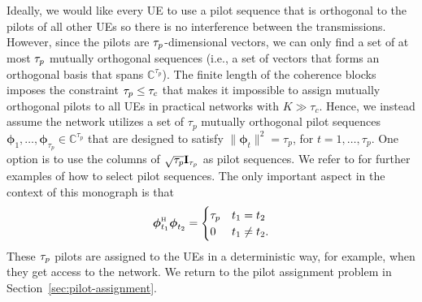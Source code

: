 Ideally, we would like every UE to use a pilot sequence that is orthogonal to the pilots of all other UEs so there is no interference between the transmissions.
However, since the pilots are $\tau_{p}$-dimensional vectors, we can only find a set of at most $\tau_{p}$ mutually orthogonal sequences (i.e., a set of vectors that forms an orthogonal basis that spans $\mathbb{C}^{\tau_p}$). 
The finite length of the coherence blocks imposes the constraint $\tau_{p}\leq \tau_c$ that makes it impossible to assign mutually orthogonal pilots to all \glspl{UE} in practical networks with $K \gg \tau_c$. 
Hence, we instead assume the network utilizes a set of $\tau_p$ mutually orthogonal pilot sequences $\boldsymbol{\phi}_{1},\ldots,\boldsymbol{\phi}_{\tau_p}\in\mathbb{C}^{\tau_p}$ that are designed to satisfy $\| \boldsymbol{\phi}_{t} \|^2 = \tau_p$, for $t=1,\ldots,\tau_p$. One option is to use the columns of $\sqrt{\tau_{p}} \mathbf{I}_{\tau_{p}}$ as pilot sequences.
We refer to \cite[Sec.~3.1.1]{massivemimobook} for further examples of how to select pilot sequences. The only important aspect in the context of this monograph is that
\begin{equation}
\boldsymbol{\phi}_{t_1} ^{\Htran} \boldsymbol{\phi}_{t_2} = \begin{cases} \tau_p & t_1 = t_2\\
0 & t_1 \neq t_2. \end{cases}
\end{equation}
These $\tau_{p}$ pilots are assigned to the UEs in a deterministic way, for example, when they get access to the network. We return to the pilot assignment problem in Section~\ref{sec:pilot-assignment}. 

